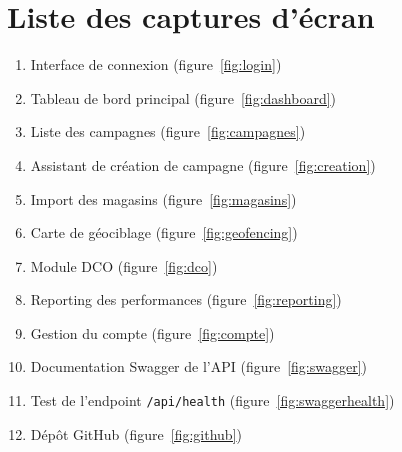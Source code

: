 \section{Liste des captures d'écran}

\begin{enumerate}
  \item Interface de connexion (figure~\ref{fig:login})
  \item Tableau de bord principal (figure~\ref{fig:dashboard})
  \item Liste des campagnes (figure~\ref{fig:campagnes})
  \item Assistant de création de campagne (figure~\ref{fig:creation})
  \item Import des magasins (figure~\ref{fig:magasins})
  \item Carte de géociblage (figure~\ref{fig:geofencing})
  \item Module DCO (figure~\ref{fig:dco})
  \item Reporting des performances (figure~\ref{fig:reporting})
  \item Gestion du compte (figure~\ref{fig:compte})
  \item Documentation Swagger de l'API (figure~\ref{fig:swagger})
  \item Test de l'endpoint \texttt{/api/health} (figure~\ref{fig:swaggerhealth})
  \item Dépôt GitHub (figure~\ref{fig:github})
\end{enumerate}
